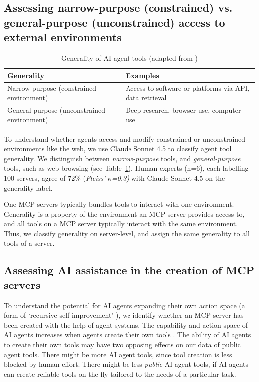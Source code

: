 \documentclass[manuscript,screen,nonacm,oneside]{acmart}
\begin{document}
\subsection{Assessing narrow-purpose (constrained) vs. general-purpose (unconstrained) access to external environments}
\label{sec:generality}

\begin{table}[htbp]
\centering
\caption{Generality of AI agent tools (adapted from \citet{CAISI2025})}
\small
\begin{tabular}{ll}
\toprule
\textbf{Generality} & \textbf{Examples} \\
\midrule
Narrow-purpose (constrained environment) & Access to software or platforms via API, data retrieval \\
General-purpose (unconstrained environment) & Deep research, browser use, computer use \\
\bottomrule
\end{tabular}
\label{tab:generality}
\end{table}
To understand whether agents access and modify constrained or unconstrained environments like the web, we use Claude Sonnet 4.5 to classify agent tool generality. We distinguish between \emph{narrow-purpose} tools, and \emph{general-purpose} tools, such as web browsing (see Table~\ref{tab:generality}). 
Human experts (n=6), each labelling 100 servers, agree of 72\% (\emph{Fleiss'} \(\kappa\)\emph{=0.3)} with Claude Sonnet 4.5 on the generality label. 

One MCP servers typically bundles tools to interact with one environment. Generality is a property of the environment an MCP server provides access to, and all tools on a MCP server typically interact with the same environment. Thus, we classify generality on server-level, and assign the same generality to all tools of a server.


\subsection{Assessing AI assistance in the creation of MCP servers}
\label{sec:ai-detection-method}

To understand the potential for AI agents expanding their own action space (a form of `recursive self-improvement' \citep{ishibashi-etal-2025-large, Barrett_2016}), we identify whether an MCP server has been created with the help of agent systems. The capability and action space of AI agents increases when agents create their own tools \citep{zhang2025darwingodelmachineopenended}. The ability of AI agents to create their own tools may have two opposing effects on our data of public agent tools. There might be more AI agent tools, since tool creation is less blocked by human effort. There might be less \textit{public} AI agent tools, if AI agents can create reliable tools on-the-fly tailored to the needs of a particular task.
\end{document}
